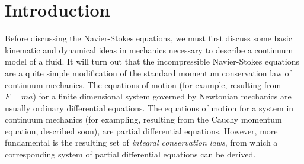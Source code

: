 
\vskip -0.4in
\section{Introduction}
Before discussing the Navier-Stokes equations,
we must first discuss some basic kinematic and dynamical ideas in mechanics necessary to describe a continuum
model of a fluid. It will turn out that the incompressible Navier-Stokes equations are a quite simple modification of
the standard momentum conservation law of continuum mechanics.
The equations of motion (for example, resulting from $F = ma$) for a finite dimensional system
governed by Newtonian mechanics are usually ordinary differential equations.
The equations of motion for a system in continuum mechanics (for exampling, resulting from the Cauchy momentum equation, described soon),
are partial differential equations. However, more fundamental is the resulting set of \textit{integral conservation laws},
from which a corresponding system of partial differential equations can be derived.

\vskip -0.4in
